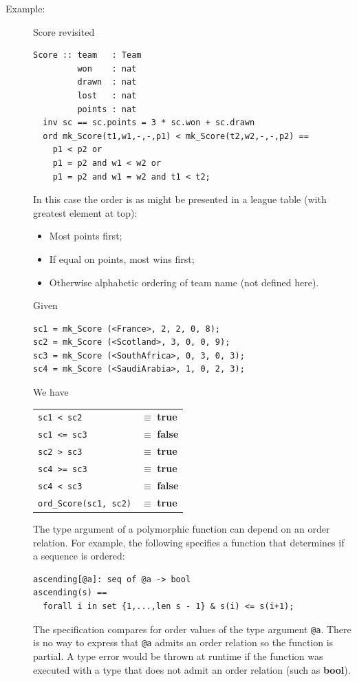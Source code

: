 \documentclass{overturerepchap}
\newcommand{\keyw}[1]{{\bf\ttfamily #1}}
\begin{document}
\begin{description}
\item [Example:] Score revisited
\begin{lstlisting}
Score :: team   : Team
         won    : nat
         drawn  : nat
         lost   : nat
         points : nat
  inv sc == sc.points = 3 * sc.won + sc.drawn
  ord mk_Score(t1,w1,-,-,p1) < mk_Score(t2,w2,-,-,p2) ==
    p1 < p2 or
    p1 = p2 and w1 < w2 or
    p1 = p2 and w1 = w2 and t1 < t2;
\end{lstlisting}
         
In this case the order is as might be presented in a league table (with greatest element at top):
\begin{itemize}
\item Most points first;
\item If equal on points, most wins first;
\item Otherwise alphabetic ordering of team name (not defined here).
\end{itemize}

Given
\begin{lstlisting}
sc1 = mk_Score (<France>, 2, 2, 0, 8);
sc2 = mk_Score (<Scotland>, 3, 0, 0, 9);
sc3 = mk_Score (<SouthAfrica>, 0, 3, 0, 3);
sc4 = mk_Score (<SaudiArabia>, 1, 0, 2, 3);
\end{lstlisting}
We have

\begin{tabular}{l l}
{\tt sc1 < sc2} & $\equiv$  \keyw{true}\\
{\tt sc1 <= sc3} & $\equiv$  \keyw{false}\\
{\tt sc2 > sc3} & $\equiv$  \keyw{true}\\
{\tt sc4 >= sc3} & $\equiv$  \keyw{true}\\
{\tt sc4 < sc3} & $\equiv$  \keyw{false}\\
{\tt ord\_Score(sc1, sc2)} & $\equiv$  \keyw{true}\\
\end{tabular}

The type argument of a polymorphic function can depend on an order relation.
For example, the following specifies a function that determines if a sequence is ordered:
\begin{lstlisting}
ascending[@a]: seq of @a -> bool
ascending(s) ==
  forall i in set {1,...,len s - 1} & s(i) <= s(i+1);
\end{lstlisting}

The specification compares for order values of the type argument {\tt @a}. There is no way to express that {\tt @a} admits an order relation so the function is partial. 
A type error would be thrown at runtime if the function was executed with a type that does not admit an order relation (such as  \keyw{bool}).
\end{description}
\end{document}
